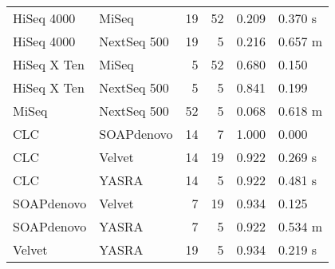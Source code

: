 \begin{table}[ht]
\begin{tabular}{llrrll}
  HiSeq 4000 & MiSeq &   19 &   52 & 0.209 & 0.370 s \\ 
  HiSeq 4000 & NextSeq 500 &   19 &    5 & 0.216 & 0.657 m \\ 
  HiSeq X Ten & MiSeq &    5 &   52 & 0.680 & 0.150 \\ 
  HiSeq X Ten & NextSeq 500 &    5 &    5 & 0.841 & 0.199 \\ 
  MiSeq & NextSeq 500 &   52 &    5 & 0.068 & 0.618 m \\ 
  CLC & SOAPdenovo &   14 &    7 & 1.000 & 0.000 \\ 
  CLC & Velvet &   14 &   19 & 0.922 & 0.269 s \\ 
  CLC & YASRA &   14 &    5 & 0.922 & 0.481 s \\ 
  SOAPdenovo & Velvet &    7 &   19 & 0.934 & 0.125 \\ 
  SOAPdenovo & YASRA &    7 &    5 & 0.922 & 0.534 m \\ 
  Velvet & YASRA &   19 &    5 & 0.934 & 0.219 s \\ 
   \hline
\end{tabular}
\end{table}
